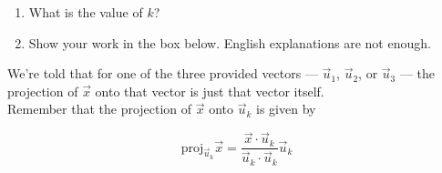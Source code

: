 \documentclass[11pt]{article}
\begin{document}
\begin{prob}
\begin{subprob}
\begin{enumerate}[label=(\roman*)]
    \item What is the value of $k$? \hspace{1cm}  
    \item Show your work in the box below. English explanations are not enough.
\end{enumerate}

\begin{solution}
We're told that for one of the three provided vectors --- $\vec u_1$, $\vec u_2$, or $\vec u_3$ --- the projection of $\vec x$ onto that vector is just that vector itself. \\

Remember that the projection of $\vec x$ onto $\vec u_k$ is given by

$$\text{proj}_{\vec u_k} \vec x = \frac{\vec x \cdot \vec u_k}{\vec u_k \cdot \vec u_k} \vec u_k$$


\end{solution}
\end{subprob}
\end{prob}
\end{document}
